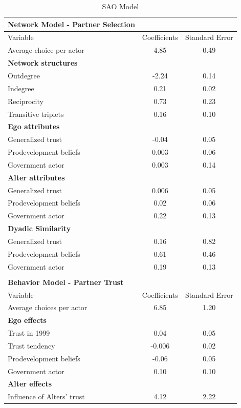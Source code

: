 \documentclass[12pt]{article} %
\numberwithin{equation}{section}		%
\numberwithin{figure}{section}			%
\numberwithin{table}{section}				%
\begin{document}
\begin{table}[ht]
 	   \caption{\label{tab05} SAO Model}
 	\centering
 	\begin{tabular}{lcc}
 		\hline
 		\textbf{Network Model - Partner Selection} & & \\
 		\hline
 		Variable & Coefficients & Standard Error \\
 		\hline
 		Average choice per actor & 4.85 & 0.49 \\
 		\textbf{Network structures} & & \\
 		Outdegree & -2.24 & 0.14 \\
 		Indegree & 0.21 & 0.02 \\
 		Reciprocity & 0.73 & 0.23 \\
 		Transitive triplets & 0.16 & 0.10 \\
 		\textbf{Ego attributes} & & \\
 		Generalized trust & -0.04 & 0.05 \\
 		Prodevelopment beliefs & 0.003 & 0.06 \\
 		Government actor & 0.003 & 0.14 \\
 		\textbf{Alter attributes} & & \\
 		Generalized trust & 0.006 & 0.05 \\
 		Prodevelopment beliefs & 0.02 & 0.06 \\
 		Government actor & 0.22 & 0.13 \\
 		\textbf{Dyadic Similarity} & & \\
 		Generalized trust & 0.16 & 0.82 \\
 		Prodevelopment beliefs & 0.61 & 0.46 \\
 		Government actor & 0.19 & 0.13 \\
 		\hline
 		& & \\
 		\hline
 		\textbf{Behavior Model - Partner Trust} & & \\
 		\hline
 		Variable & Coefficients & Standard Error \\
 		\hline
 		Average choices per actor & 6.85 & 1.20 \\
 		\textbf{Ego effects} & & \\
 		Trust in 1999 & 0.04 & 0.05 \\
 		Trust tendency & -0.006 & 0.02 \\
 		Prodevelopment beliefs & -0.06 & 0.05 \\
 		Government actor & 0.10 & 0.10 \\
 		\textbf{Alter effects} & & \\
 		Influence of Alters' trust & 4.12 & 2.22 \\
 		\hline
 	\end{tabular}
\end{table}
\end{document}
